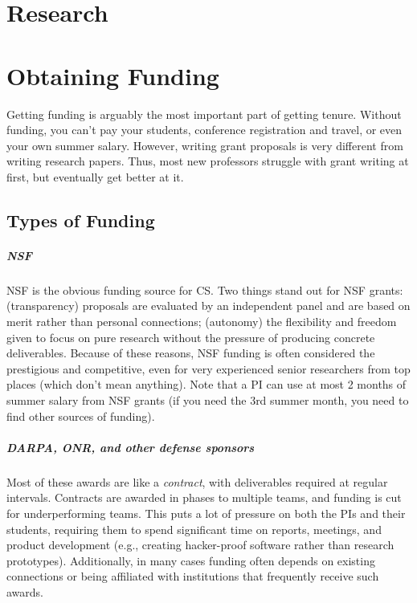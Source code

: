 \documentclass[oneside,11pt,dvipsnames]{book}
\begin{document}
\chapter{Research}
\chapter{Obtaining Funding}
Getting funding is arguably the most important part of getting tenure.  Without funding, you can't pay your students, conference registration and travel, or even your own summer salary. However, writing grant proposals is very different from writing research papers. Thus, most new professors struggle with grant writing at first, but eventually get better at it.





\section{Types of Funding}
\paragraph{NSF} NSF is the obvious funding source for CS. 
Two things stand out for NSF grants: (transparency) proposals are evaluated by an independent panel and are based on merit rather than personal connections; (autonomy) the flexibility and freedom given to focus on pure research without the pressure of producing concrete deliverables.  Because of these reasons, NSF funding is often considered the prestigious and competitive, even for very experienced senior researchers from top places (which don't mean anything). Note that a PI can use at most 2 months of summer salary from NSF grants (if you need the 3rd summer month, you need to find other sources of funding).

\paragraph{DARPA, ONR, and other defense sponsors} Most of these awards are like a \emph{contract}, with deliverables required at regular intervals. Contracts are awarded in phases to multiple teams, and funding is cut for underperforming teams. This puts a lot of pressure on both the PIs and their students, requiring them to spend significant time on reports, meetings, and product development (e.g., creating hacker-proof software rather than research prototypes). Additionally, in many cases funding often depends on existing connections or being affiliated with institutions that frequently receive such awards.
\end{document}

